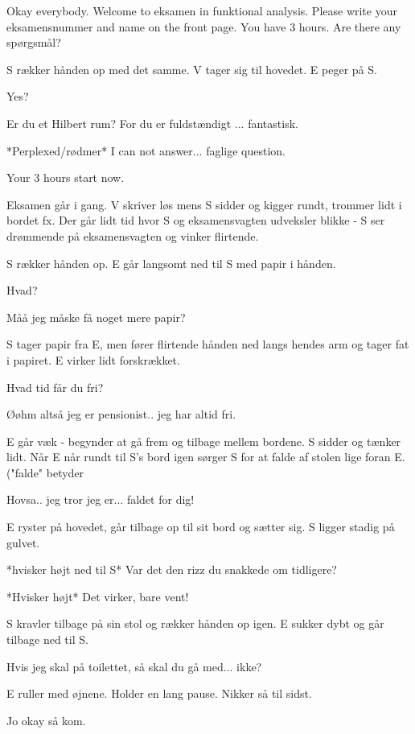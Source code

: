 \documentclass[a4paper,11pt]{article}
\begin{document}
\begin{sketch}
 Okay everybody. Welcome to eksamen in funktional analysis.  Please write your eksamensnummer and name on the front page. You have 3 hours. Are there any spørgsmål?

\scene S rækker hånden op med det samme. V tager sig til hovedet. E peger på S.

 Yes?

 Er du et Hilbert rum? For du er fuldstændigt ... fantastisk.

 *Perplexed/rødmer* I can not answer... faglige question.

 Your 3 hours start now.

\scene Eksamen går i gang. V skriver løs mens S sidder og kigger rundt, trommer lidt i bordet fx. Der går lidt tid hvor S og eksamensvagten udveksler blikke - S ser drømmende på eksamensvagten og vinker flirtende.

\scene S rækker hånden op. E går langsomt ned til S med papir i hånden. 

 Hvad?

 Måå jeg måske få noget mere papir? 

\scene S tager papir fra E, men fører flirtende hånden ned langs hendes arm og tager fat i papiret. E virker lidt forskrækket.

 Hvad tid får du fri?

 Øøhm altså jeg er pensionist.. jeg har altid fri. 

\scene E går væk - begynder at gå frem og tilbage mellem bordene. 
S sidder og tænker lidt. Når E når rundt til S's bord igen sørger S for at falde af stolen lige foran E. ("falde" betyder

 Hovsa.. jeg tror jeg er... faldet for dig! 

\scene E ryster på hovedet, går tilbage op til sit bord og sætter sig. S ligger stadig på gulvet.  

 *hvisker højt ned til S* Var det den rizz du snakkede om tidligere? 

 *Hvisker højt* Det virker, bare vent! 

\scene S kravler tilbage på sin stol og  rækker hånden op igen. E sukker dybt og går tilbage ned til S. 

 Hvis jeg skal på toilettet, så skal du gå med... ikke?

\scene E ruller med øjnene. Holder en lang pause. Nikker så til sidst. 

 Jo okay så kom. 


\end{sketch}
\end{document}
